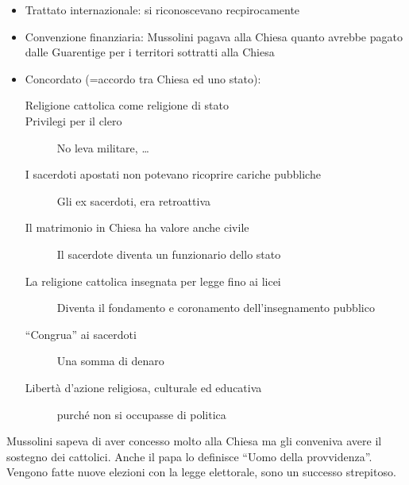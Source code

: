 \begin{itemize}
  \item Trattato internazionale: si riconoscevano recpirocamente
  \item Convenzione finanziaria: Mussolini pagava alla Chiesa quanto avrebbe pagato dalle Guarentige
    per i territori sottratti alla Chiesa
  \item Concordato (=accordo tra Chiesa ed uno stato):
    \begin{description}
      \item[Religione cattolica come religione di stato] 
      \item[Privilegi per il clero] No leva militare, \ldots
      \item[I sacerdoti apostati non potevano ricoprire cariche pubbliche] Gli ex sacerdoti, era
        retroattiva
      \item[Il matrimonio in Chiesa ha valore anche civile] Il sacerdote diventa un funzionario dello
        stato
      \item[La religione cattolica insegnata per legge fino ai licei] Diventa il fondamento e 
        coronamento dell'insegnamento pubblico
      \item[``Congrua'' ai sacerdoti] Una somma di denaro
      \item[Libertà d'azione religiosa, culturale ed educativa] purché non si occupasse di politica
    \end{description}
\end{itemize}
Mussolini sapeva di aver concesso molto alla Chiesa ma gli conveniva avere il sostegno dei cattolici.
Anche il papa lo definisce ``Uomo della provvidenza''.\\
Vengono fatte nuove elezioni con la legge elettorale, sono un successo strepitoso.

